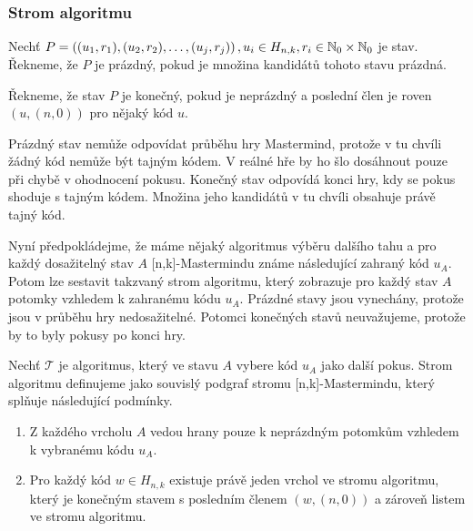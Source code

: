 \subsubsection{Strom algoritmu}

\begin{definice}\label{kandidat}
  Nechť $P = \left((u_1, r_1), (u_2,r_2), \dots, (u_j,r_j)\right), u_i \in H_{n,k}, r_i \in \mathbb{N} _0 \times \mathbb{N} _0$ je stav. Řekneme, že $P$ je prázdný, pokud je množina kandidátů tohoto stavu prázdná. 

  Řekneme, že stav $P$ je konečný, pokud je neprázdný a poslední člen je roven $(u,(n,0))$ pro nějaký kód $u$.
\end{definice}

Prázdný stav nemůže odpovídat průběhu hry Mastermind, protože v tu chvíli žádný kód nemůže být tajným kódem. V reálné hře by ho šlo dosáhnout pouze při chybě v ohodnocení pokusu. Konečný stav odpovídá konci hry, kdy se pokus shoduje s tajným kódem. Množina jeho kandidátů v tu chvíli obsahuje právě tajný kód. 




Nyní předpokládejme, že máme nějaký algoritmus výběru dalšího tahu a pro každý dosažitelný stav $A$ [n,k]-Mastermindu známe následující zahraný kód $u_A$. Potom lze sestavit takzvaný strom algoritmu, který zobrazuje pro každý stav $A$ potomky vzhledem k zahranému kódu $u_A$. Prázdné stavy jsou vynechány, protože jsou v průběhu hry nedosažitelné. Potomci konečných stavů neuvažujeme, protože by to byly pokusy po konci hry. 

\begin{definice}
  Nechť $\mathcal{T}$ je algoritmus, který ve stavu $A$ vybere kód $u_A$ jako další pokus. Strom algoritmu definujeme jako souvislý podgraf stromu [n,k]-Mastermindu, který splňuje následující podmínky.
  \begin{enumerate}
      \item Z každého vrcholu $A$ vedou hrany pouze k neprázdným potomkům vzhledem k vybranému kódu $u_A$. 
      \item Pro každý kód $w \in H_{n,k}$ existuje právě jeden vrchol ve stromu algoritmu, který je konečným stavem s posledním členem $(w, (n,0))$ a zároveň listem ve stromu algoritmu. 
      
  \end{enumerate}
\end{definice}

